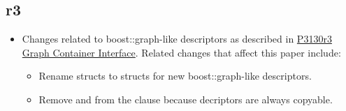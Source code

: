 \subsection*{\paperno r3}

\begin{itemize}
      \item Changes related to boost::graph-like descriptors as described in \href{https://www.wg21.link/P3130r3}{P3130r3 Graph Container Interface}.
            Related changes that affect this paper include:
            \begin{itemize}
                  \item Rename structs to structs for new boost::graph-like descriptors.
                  \item Remove and from the clause 
                        because decriptors are always copyable.
            \end{itemize}
      
\end{itemize}
